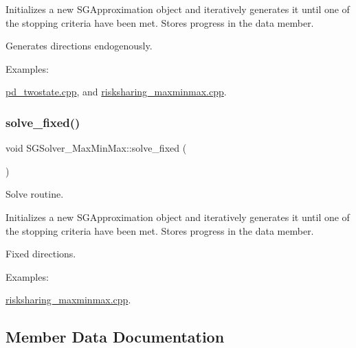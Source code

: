 Initializes a new S\+G\+Approximation object and iteratively generates it until one of the stopping criteria have been met. Stores progress in the data member.

Generates directions endogenously. \begin{Desc}
\item[Examples\+: ]\par
\hyperlink{pd_twostate_8cpp-example}{pd\+\_\+twostate.\+cpp}, and \hyperlink{risksharing_maxminmax_8cpp-example}{risksharing\+\_\+maxminmax.\+cpp}.\end{Desc}
\mbox{\label{classSGSolver__MaxMinMax_a27b1ef962eb87c0495f2d0f733432c36}} 
\subsubsection{\texorpdfstring{solve\+\_\+fixed()}{solve\_fixed()}}
{\footnotesize\ttfamily void S\+G\+Solver\+\_\+\+Max\+Min\+Max\+::solve\+\_\+fixed (\begin{DoxyParamCaption}{ }\end{DoxyParamCaption})}



Solve routine. 

Initializes a new S\+G\+Approximation object and iteratively generates it until one of the stopping criteria have been met. Stores progress in the data member.

Fixed directions. \begin{Desc}
\item[Examples\+: ]\par
\hyperlink{risksharing_maxminmax_8cpp-example}{risksharing\+\_\+maxminmax.\+cpp}.\end{Desc}


\subsection{Member Data Documentation}
\mbox{\label{classSGSolver__MaxMinMax_ad1a4bf22aaa58dd05c7bc7a24d9c1805}} 
